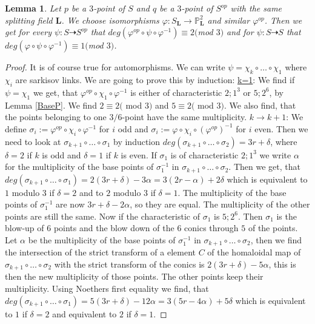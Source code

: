 \documentclass[12pt, oneside, reqno]{amsart}
\newtheorem{lemma}[theorem]{Lemma}
\begin{document}
\begin{lemma}
    Let $p$ be a $3$-point of $S$ and $q$ be a $3$-point of $S^{op}$ with the same splitting field $\textbf{L}$. We choose isomorphisms $\varphi:S_{\textbf{L}}\rightarrow \mathbb{P}^2_{\textbf{L}}$ and similar $\varphi^{op}$. Then we get for every $\psi: S \dashrightarrow S^{op}$ that $deg(\varphi^{op} \circ \psi \circ \varphi^{-1}) \equiv 2 ($mod $3)$ and for $\psi: S \dashrightarrow S$ that $deg(\varphi \circ \psi \circ \varphi^{-1}) \equiv 1 ($mod $3)$.
\end{lemma}
\begin{proof}
    It is of course true for automorphisms. We can write $\psi = \chi_k \circ \dots \circ \chi_1$  where $\chi_i$ are sarkisov links. We are going to prove this by induction:
    \newline
    \underline{k=1}: We find if $\psi = \chi_1$ we get, that $\varphi^{op} \circ \chi_1 \circ \varphi^{-1}$ is either of characteristic $2;1^3$ or $5;2^6$, by Lemma \ref{BaseP}. We find $2 \equiv 2 ($ mod $ 3)$ and $5 \equiv 2 ($ mod $ 3)$. We also find, that the points belonging to one $3/6$-point have the same multiplicity. \newline
    \underline{$k \rightarrow k+1$}: We define $\sigma_i := \varphi^{op} \circ \chi_i \circ \varphi^{-1}$ for $i$ odd and $\sigma_i := \varphi \circ\chi_i \circ (\varphi^{op})^{-1}$ for $i$ even. Then we need to look at $\sigma_{k+1} \circ \dots \circ \sigma_1$ by induction $deg(\sigma_{k+1} \circ \dots \circ \sigma_2) = 3r + \delta$, where $\delta = 2$ if $k$ is odd and $\delta = 1$ if $k$ is even. If $\sigma_1$ is of characteristic $2;1^3$ we write $\alpha$ for the multiplicity of the base points of $\sigma_1^{-1}$ in $\sigma_{k+1} \circ \dots \circ \sigma_2$. Then we get, that $deg(\sigma_{k+1} \circ \dots \circ \sigma_1) = 2(3r + \delta) - 3\alpha = 3(2r - \alpha) + 2 \delta$ which is equivalent to $1$ modulo $3$ if $\delta = 2$ and to $2$ modulo $3$ if $\delta = 1$. The multiplicity of the base points of $\sigma_1^{-1}$ are now $3r + \delta - 2 \alpha$, so they are equal. The multiplicity of the other points are still the same. Now if the characteristic of $\sigma_1$ is $5;2^6$. Then $\sigma_1$ is the blow-up of $6$ points and the blow down of the $6$ conics through $5$ of the points. Let $\alpha$ be the multiplicity of the base points of $\sigma_1^{-1}$ in $\sigma_{k+1} \circ \dots \circ \sigma_2$, then we find the intersection of the strict transform of a element $C$ of the homaloidal map of $\sigma_{k+1} \circ \dots \circ \sigma_2$ with the strict transform of the conics is $2(3r + \delta) - 5\alpha$, this is then the new multiplicity of those points. The other points keep their multiplicity. Using Noethers first equality we find, that $deg(\sigma_{k+1} \circ \dots \circ \sigma_1) = 5(3r + \delta) - 12 \alpha = 3(5r - 4 \alpha) + 5\delta$ which is equivalent to $1$ if $\delta =2$ and equivalent to $2$ if $\delta = 1$.
\end{proof}
\end{document}
